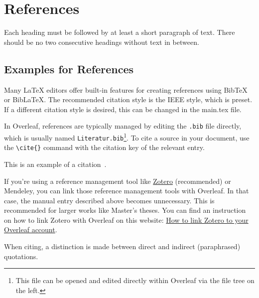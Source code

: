 %
%

\section{References}
\label{sec:references}

Each heading must be followed by at least a short paragraph of text. There should be no two consecutive headings without text in between.


\subsection{Examples for References}
\label{sec:examplesForReferences}

Many LaTeX editors offer built-in features for creating references using BibTeX or BibLaTeX. The recommended citation style is the IEEE style, which is preset. If a different citation style is desired, this can be changed in the main.tex file.

In Overleaf, references are typically managed by editing the \texttt{.bib} file directly, which is usually named \texttt{Literatur.bib}\footnote{This file can be opened and edited directly within Overleaf via the file tree on the left.}. To cite a source in your document, use the \verb|\cite{}| command with the citation key of the relevant entry.

This is an example of a citation~\cite{Hunt2019}.

If you're using a reference management tool like \href{https://www.zotero.org}{Zotero} (recommended) or Mendeley, you can link those reference management tools with Overleaf. In that case, the manual entry described above becomes unnecessary. This is recommended for larger works like Master's theses. You can find an instruction on how to link Zotero with Overleaf on this website: \href{https://www.overleaf.com/learn/how-to/How_to_link_Zotero_to_your_Overleaf_account}{How to link Zotero to your Overleaf account}.

When citing, a distinction is made between direct and indirect (paraphrased) quotations.


